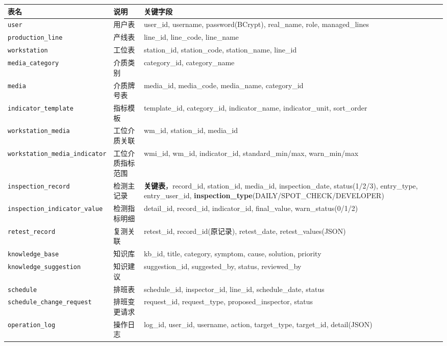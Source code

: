 \documentclass[12pt,a4paper]{ctexart}
\begin{document}
\begin{longtable}{|l|l|p{7cm}|}
\hline
\textbf{表名} & \textbf{说明} & \textbf{关键字段} \\
\hline
\endfirsthead
\hline
\endhead
\hline
\texttt{user} & 用户表 & user\_id, username, password(BCrypt), real\_name, role, managed\_lines \\
\texttt{production\_line} & 产线表 & line\_id, line\_code, line\_name \\
\texttt{workstation} & 工位表 & station\_id, station\_code, station\_name, line\_id \\
\texttt{media\_category} & 介质类别 & category\_id, category\_name \\
\texttt{media} & 介质牌号表 & media\_id, media\_code, media\_name, category\_id \\
\texttt{indicator\_template} & 指标模板 & template\_id, category\_id, indicator\_name, indicator\_unit, sort\_order \\
\texttt{workstation\_media} & 工位介质关联 & wm\_id, station\_id, media\_id \\
\texttt{workstation\_media\_indicator} & 工位介质指标范围 & wmi\_id, wm\_id, indicator\_id, standard\_min/max, warn\_min/max \\
\texttt{inspection\_record} & 检测主记录 & \textbf{关键表}，record\_id, station\_id, media\_id, inspection\_date, status(1/2/3), entry\_type, entry\_user\_id, \textbf{inspection\_type}(DAILY/SPOT\_CHECK/DEVELOPER) \\
\texttt{inspection\_indicator\_value} & 检测指标明细 & detail\_id, record\_id, indicator\_id, final\_value, warn\_status(0/1/2) \\
\texttt{retest\_record} & 复测关联 & retest\_id, record\_id(原记录), retest\_date, retest\_values(JSON) \\
\texttt{knowledge\_base} & 知识库 & kb\_id, title, category, symptom, cause, solution, priority \\
\texttt{knowledge\_suggestion} & 知识建议 & suggestion\_id, suggested\_by, status, reviewed\_by \\
\texttt{schedule} & 排班表 & schedule\_id, inspector\_id, line\_id, schedule\_date, status \\
\texttt{schedule\_change\_request} & 排班变更请求 & request\_id, request\_type, proposed\_inspector, status \\
\texttt{operation\_log} & 操作日志 & log\_id, user\_id, username, action, target\_type, target\_id, detail(JSON) \\
\hline
\end{longtable}
\end{document}
